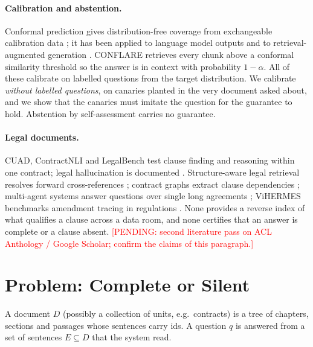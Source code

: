 \documentclass[11pt]{article}
\newcommand{\pending}[1]{\textcolor{red}{[PENDING: #1]}}   %
\begin{document}
\paragraph{Calibration and abstention.} Conformal prediction gives distribution-free coverage from exchangeable calibration data \citep{vovk2005algorithmic,papadopoulos2002inductive,lei2018distribution,angelopoulos2021gentle}; it has been applied to language model outputs \citep{quach2024conformal,mohri2024conformal} and to retrieval-augmented generation \citep{li2023traq,kang2024crag}. CONFLARE \citep{rouzrokh2024conflare} retrieves every chunk above a conformal similarity threshold so the answer is in context with probability $1-\alpha$. All of these calibrate on labelled questions from the target distribution. We calibrate \emph{without labelled questions}, on canaries planted in the very document asked about, and we show that the canaries must imitate the question for the guarantee to hold. Abstention by self-assessment \citep{kadavath2022know,asai2024selfrag} carries no guarantee.

\paragraph{Legal documents.} CUAD, ContractNLI and LegalBench \citep{hendrycks2021cuad,koreeda2021contractnli,guha2023legalbench} test clause finding and reasoning within one contract; legal hallucination is documented \citep{magesh2024hallucination}. Structure-aware legal retrieval resolves forward cross-references \citep{jalocha2026crawler,singh2026strucchunk}; contract graphs extract clause dependencies \citep{dechtiar2025graphgrpolex}; multi-agent systems answer questions over single long agreements \citep{raptopoulos2025pakton}; ViHERMES benchmarks amendment tracing in regulations \citep{nguyen2026vihermes}. None provides a reverse index of what qualifies a clause across a data room, and none certifies that an answer is complete or a clause absent. \pending{second literature pass on ACL Anthology / Google Scholar; confirm the claims of this paragraph.}

\section{Problem: Complete or Silent}
\label{sec:problem}

A document $D$ (possibly a collection of units, e.g.\ contracts) is a tree of chapters, sections and passages whose sentences carry ids. A question $q$ is answered from a set of sentences $E \subseteq D$ that the system read.
\end{document}
